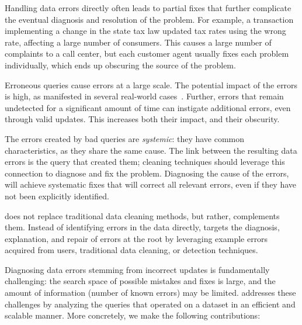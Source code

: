 \begin{description}[leftmargin=*, topsep=0mm, itemsep=0mm]
    
    \item[Obscurity.] 
    Handling data errors directly often
    leads to partial fixes that further complicate the eventual diagnosis and
    resolution of the problem. For example, a transaction implementing a
    change in the state tax law updated tax rates using the wrong rate,
    affecting a large number of consumers. This causes a large number of
    complaints to a call center, but each customer agent usually fixes each
    problem individually, which ends up obscuring the source of the problem.
    
    \item[Large impact.] Erroneous queries cause errors at a large scale. The
    potential impact of the errors is high, as manifested in several
    real-world cases~\cite{Yates10, Grady13, sakalerrors}. Further, errors
    that remain undetected for a significant amount of time can instigate
    additional errors, even through valid updates. This increases both their
    impact, and their obscurity.
    
    \item[Systemic errors.] The errors created by bad queries are
    \emph{systemic}: they have common characteristics, as they share the same
    cause. The link between the resulting data errors is the query that
    created them; cleaning techniques should leverage this connection to
    diagnose and fix the problem. Diagnosing the cause of the errors, will
    achieve systematic fixes that will correct all relevant errors, even if
    they have not been explicitly identified.
    
\end{description}
\sys does not replace traditional data cleaning methods, but rather, complements them.
Instead of identifying errors in the data directly, 
\sys targets the diagnosis, explanation, and repair of errors at the root by
leveraging example errors acquired from 
users, traditional data cleaning, or detection techniques.

Diagnosing data errors stemming from incorrect updates is fundamentally
challenging: the search space of possible mistakes and fixes is large, and the
amount of information (number of known errors) may be limited. 
\sys addresses these challenges by analyzing the queries that operated on a
dataset in an efficient and scalable manner. More concretely, we make the
following contributions:





